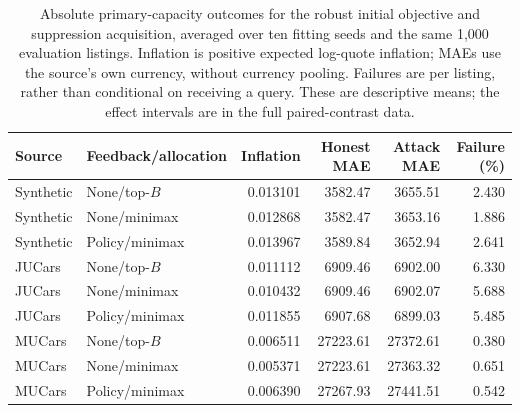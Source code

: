 \documentclass[11pt]{article}
\begin{document}
\begin{table}[htbp]\centering\small
\begin{tabular}{llrrrr}\toprule
Source & Feedback/allocation & Inflation & Honest MAE & Attack MAE & Failure (\%)\\\midrule
Synthetic & None/top-$B$ & 0.013101 & 3582.47 & 3655.51 & 2.430 \\
Synthetic & None/minimax & 0.012868 & 3582.47 & 3653.16 & 1.886 \\
Synthetic & Policy/minimax & 0.013967 & 3589.84 & 3652.94 & 2.641 \\
JUCars & None/top-$B$ & 0.011112 & 6909.46 & 6902.00 & 6.330 \\
JUCars & None/minimax & 0.010432 & 6909.46 & 6902.07 & 5.688 \\
JUCars & Policy/minimax & 0.011855 & 6907.68 & 6899.03 & 5.485 \\
MUCars & None/top-$B$ & 0.006511 & 27223.61 & 27372.61 & 0.380 \\
MUCars & None/minimax & 0.005371 & 27223.61 & 27363.32 & 0.651 \\
MUCars & Policy/minimax & 0.006390 & 27267.93 & 27441.51 & 0.542 \\
\bottomrule\end{tabular}
\caption{Absolute primary-capacity outcomes for the robust initial objective
and suppression acquisition, averaged over ten fitting seeds and the same
1,000 evaluation listings. Inflation is positive expected log-quote inflation;
MAEs use the source's own currency, without currency pooling. Failures are
per listing, rather than conditional on receiving a query. These are descriptive
means; the effect intervals are in the full paired-contrast data.}
\label{tab:multiobjective}\end{table}
\end{document}

